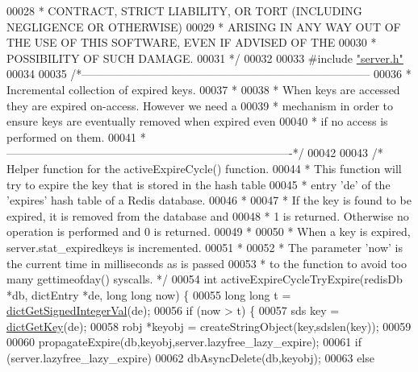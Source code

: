 \begin{DoxyCode}
00028 \textcolor{comment}{ * CONTRACT, STRICT LIABILITY, OR TORT (INCLUDING NEGLIGENCE OR OTHERWISE)}
00029 \textcolor{comment}{ * ARISING IN ANY WAY OUT OF THE USE OF THIS SOFTWARE, EVEN IF ADVISED OF THE}
00030 \textcolor{comment}{ * POSSIBILITY OF SUCH DAMAGE.}
00031 \textcolor{comment}{ */}
00032 
00033 \textcolor{preprocessor}{#}\textcolor{preprocessor}{include} \hyperlink{server_8h}{"server.h"}
00034 
00035 \textcolor{comment}{/*-----------------------------------------------------------------------------}
00036 \textcolor{comment}{ * Incremental collection of expired keys.}
00037 \textcolor{comment}{ *}
00038 \textcolor{comment}{ * When keys are accessed they are expired on-access. However we need a}
00039 \textcolor{comment}{ * mechanism in order to ensure keys are eventually removed when expired even}
00040 \textcolor{comment}{ * if no access is performed on them.}
00041 \textcolor{comment}{ *----------------------------------------------------------------------------*/}
00042 
00043 \textcolor{comment}{/* Helper function for the activeExpireCycle() function.}
00044 \textcolor{comment}{ * This function will try to expire the key that is stored in the hash table}
00045 \textcolor{comment}{ * entry 'de' of the 'expires' hash table of a Redis database.}
00046 \textcolor{comment}{ *}
00047 \textcolor{comment}{ * If the key is found to be expired, it is removed from the database and}
00048 \textcolor{comment}{ * 1 is returned. Otherwise no operation is performed and 0 is returned.}
00049 \textcolor{comment}{ *}
00050 \textcolor{comment}{ * When a key is expired, server.stat\_expiredkeys is incremented.}
00051 \textcolor{comment}{ *}
00052 \textcolor{comment}{ * The parameter 'now' is the current time in milliseconds as is passed}
00053 \textcolor{comment}{ * to the function to avoid too many gettimeofday() syscalls. */}
00054 \textcolor{keywordtype}{int} activeExpireCycleTryExpire(redisDb *db, dictEntry *de, \textcolor{keywordtype}{long} \textcolor{keywordtype}{long} now) \{
00055     \textcolor{keywordtype}{long} \textcolor{keywordtype}{long} t = \hyperlink{dict_8h_a31f34bf34a743e3ebf122fa231b28d57}{dictGetSignedIntegerVal}(de);
00056     \textcolor{keywordflow}{if} (now > t) \{
00057         sds key = \hyperlink{dict_8h_a3271c334309904a3086deca94f96e46e}{dictGetKey}(de);
00058         robj *keyobj = createStringObject(key,sdslen(key));
00059 
00060         propagateExpire(db,keyobj,server.lazyfree\_lazy\_expire);
00061         \textcolor{keywordflow}{if} (server.lazyfree\_lazy\_expire)
00062             dbAsyncDelete(db,keyobj);
00063         \textcolor{keywordflow}{else}

\end{DoxyCode}
